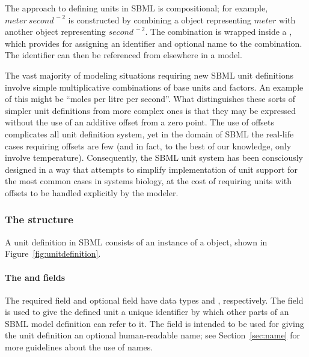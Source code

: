 The approach to defining units in SBML is compositional; for
example, $meter\ second^{\,-2}$ is constructed by combining a
\Unit object representing $meter$ with another \Unit object
representing $second^{\,-2}$.  The combination is wrapped inside a
\UnitDefinition, which provides for assigning an identifier and
optional name to the combination.  The identifier can then be
referenced from elsewhere in a model.

The vast majority of modeling situations requiring new SBML unit
definitions involve simple multiplicative combinations of base
units and factors.  An example of this might be ``moles per litre
per second''.  What distinguishes these sorts of simpler unit
definitions from more complex ones is that they may be expressed
without the use of an additive offset from a zero point.  The use
of offsets complicates all unit definition system, yet in the
domain of SBML the real-life cases requiring offsets are few (and
in fact, to the best of our knowledge, only involve temperature).
Consequently, the SBML unit system has been consciously designed
in a way that attempts to simplify implementation of unit support
for the most common cases in systems biology, at the cost of
requiring units with offsets to be handled explicitly by the
modeler.


\subsubsection{The  structure}
\label{sec:unitdefinition-structure}

A unit definition in SBML consists of an instance of a
\UnitDefinition object, shown in Figure~\ref{fig:unitdefinition}.


\paragraph{The  and  fields}

The required field  and optional field  have
data types  and , respectively.
The  field is used to give the defined unit a unique
identifier by which other parts of an SBML model definition can
refer to it.  The  field is intended to be used for
giving the unit definition an optional human-readable name; see
Section~\ref{sec:name} for more guidelines about the use of names.

